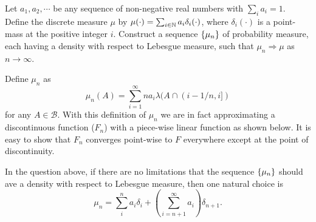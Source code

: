\begin{problem}
	Let $ a_1,a_2,\cdots $ be any sequence of non-negative real numbers with $ \sum_i a_i = 1 $. Define the discrete measure $ \mu $ by $ \mu(\cdot) = \sum_{i\in \mathbb{N}}a_i\delta_i(\cdot) $, where $ \delta_i(\cdot) $ is a point-mass at the positive integer $ i $. Construct a sequence $ \{\mu_n\} $ of probability measure, each having a density with respect to Lebesgue measure, such that $ \mu_n \Rightarrow \mu $ as $ n\to\infty $.
\end{problem}
\begin{solution}
	Define $ \mu_n $ as
	\[ \mu_n(A) = \sum_{i=1}^{\infty}na_i \lambda(A\cap(i-1/n,i]) \]
	for any $ A \in \mathcal{B} $. With this definition of $ \mu_n $ we are in fact approximating a discontinuous function ($ F_n $) with a piece-wise linear function as shown below. It is easy to show that $ F_n $ converges point-wise to $ F $ everywhere except at the point of discontinuity.
	
	
\end{solution}

\begin{remark}
	In the question above, if there are no limitations that the sequence $ \{\mu_n\} $ should ave a density with respect to Lebesgue measure, then one natural choice is
	\[ \mu_n = \sum_{i}^{n} a_i \delta_i + (\sum_{i=n+1}^{\infty}a_i)\delta_{n+1}. \]
\end{remark}


